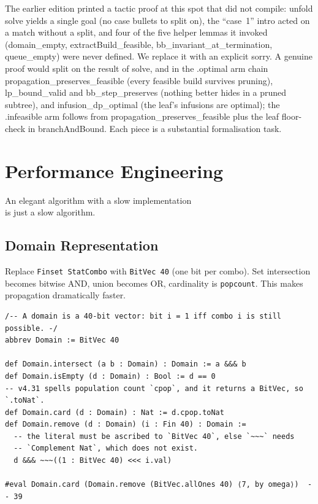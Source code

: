 \documentclass[11pt, a4paper, oneside]{book}
\newcommand{\li}[1]{{\ttfamily\small\color{deepblue}#1}}
\begin{document}
\begin{warningbox}[title={Why not a real proof here?}]
The earlier edition printed a tactic proof at this spot that did not compile:
\li{unfold solve} yields a single goal (no case bullets to split on), the
``case~1'' \li{intro} acted on a \li{match} without a \li{split}, and four of
the five helper lemmas it invoked (\li{domain\_empty}, \li{extractBuild\_feasible},
\li{bb\_invariant\_at\_termination}, \li{queue\_empty}) were never defined.  We
replace it with an explicit \li{sorry}.  A genuine proof would \li{split} on the
result of \li{solve}, and in the \li{.optimal} arm chain
\li{propagation\_preserves\_feasible} (every feasible build survives pruning),
\li{lp\_bound\_valid} and \li{bb\_step\_preserves} (nothing better hides in a
pruned subtree), and \li{infusion\_dp\_optimal} (the leaf's infusions are
optimal); the \li{.infeasible} arm follows from
\li{propagation\_preserves\_feasible} plus the leaf floor-check in
\li{branchAndBound}.  Each piece is a substantial formalisation task.
\end{warningbox}

\chapter{Performance Engineering}
\label{ch:perf}

\epigraph{An elegant algorithm with a slow implementation\\
is just a slow algorithm.}{}

\section{Domain Representation}

Replace \texttt{Finset StatCombo} with \texttt{BitVec 40} (one bit per
combo).  Set intersection becomes bitwise AND, union becomes OR, cardinality
is \texttt{popcount}.  This makes propagation dramatically faster.

\begin{leanbox}[title={Lean 4 --- BitVec Domain}]
\begin{verbatim}
/-- A domain is a 40-bit vector: bit i = 1 iff combo i is still possible. -/
abbrev Domain := BitVec 40

def Domain.intersect (a b : Domain) : Domain := a &&& b
def Domain.isEmpty (d : Domain) : Bool := d == 0
-- v4.31 spells population count `cpop`, and it returns a BitVec, so `.toNat`.
def Domain.card (d : Domain) : Nat := d.cpop.toNat
def Domain.remove (d : Domain) (i : Fin 40) : Domain :=
  -- the literal must be ascribed to `BitVec 40`, else `~~~` needs
  -- `Complement Nat`, which does not exist.
  d &&& ~~~((1 : BitVec 40) <<< i.val)

#eval Domain.card (Domain.remove (BitVec.allOnes 40) ⟨7, by omega⟩)  -- 39
\end{verbatim}
\end{leanbox}
\end{document}
